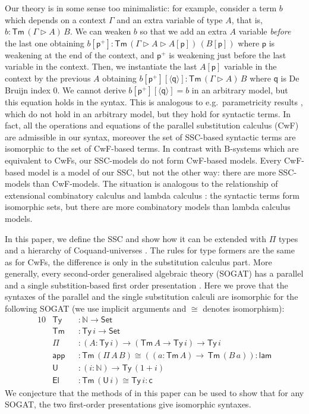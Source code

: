 \documentclass[sigplan,10pt,anonymous,review]{acmart}\settopmatter{printfolios=true,printccs=false,printacmref=false}
\newcommand{\ra}{\rightarrow}
\newcommand{\Set}{\mathsf{Set}}
\newcommand{\Ty}{\mathsf{Ty}}
\newcommand{\Tm}{\mathsf{Tm}}
\newcommand{\p}{\mathsf{p}}
\newcommand{\q}{\mathsf{q}}
\newcommand{\ext}{\mathop{\triangleright}}
\newcommand{\N}{\mathbb{N}}
\newcommand{\lam}{\mathsf{lam}}
\newcommand{\app}{\mathsf{app}}
\newcommand{\U}{\mathsf{U}}
\newcommand{\El}{\mathsf{El}}
\newcommand{\cd}{\mathsf{c}}
\begin{document}
Our theory is in some sense too minimalistic: for example, consider a
term $b$ which depends on a context $\Gamma$ and an extra variable of
type $A$, that is, $b : \Tm\,(\Gamma\ext A)\,B$. We can weaken $b$ so
that we add an extra $A$ variable \emph{before} the last one obtaining
$b[\p^+] : \Tm\,(\Gamma\ext A\ext A[\p])\,(B[\p])$ where $\p$ is
weakening at the end of the context, and $\p^+$ is weakening just
before the last variable in the context. Then, we instantiate the last
$A[\p]$ variable in the context by the previous $A$ obtaining
$b[\p^+][\langle\q\rangle] : \Tm\,(\Gamma\ext A)\,B$ where $\q$ is De
Bruijn index $0$. We cannot derive $b[\p^+][\langle\q\rangle] = b$ in
an arbitrary model, but this equation holds in the syntax.
This is analogous to e.g.\ parametricity results
\cite{DBLP:journals/jfp/BernardyJP12}, which do not hold in an
arbitrary model, but they hold for syntactic terms. In fact, all the
operations and equations of the parallel substitution calculus (CwF)
are admissible in our syntax, moreover the set of SSC-based syntactic
terms are isomorphic to the set of CwF-based terms. In contrast with
B-systems which are equivalent to CwFs, our SSC-models do not form
CwF-based models. Every CwF-based model is a model of our SSC, but not
the other way: there are more SSC-models than CwF-models. The
situation is analogous to the relationship of extensional combinatory
calculus and lambda calculus \cite{DBLP:conf/fscd/AltenkirchKSV23}:
the syntactic terms form isomorphic sets, but there are more
combinatory models than lambda calculus models.

In this paper, we define the SSC and show how it can be extended with
$\Pi$ types and a hierarchy of Coquand-universes
\cite{coquandUniverse}. The rules for type formers are the same as for
CwFs, the difference is only in the substitution calculus part. More
generally, every second-order generalised algebraic theory (SOGAT) has
a parallel and a single substition-based first order presentation
\cite{DBLP:conf/fscd/KaposiX24}. Here we prove that the syntaxes of
the parallel and the single substitution calculi are isomorphic for
the following SOGAT (we use implicit arguments and $\cong$ denotes
isomorphism):
\begin{alignat*}{10}
  & \Ty && : \N\ra\Set \\
  & \Tm && : \Ty\,i\ra\Set \\
  & \Pi && : (A:\Ty\,i)\ra(\Tm\,A\ra\Ty\,i)\ra\Ty\,i \\
  & \app && : \Tm\,(\Pi\,A\,B)\cong((a:\Tm\,A)\ra\,\Tm\,(B\,a)): \lam \\
  & \U && : (i:\N)\ra\Ty\,(1+i) \\
  & \El && : \Tm\,(\U\,i)\cong\Ty\,i : \cd
\end{alignat*}
We conjecture that the methods of in this paper can be used to show
that for any SOGAT, the two first-order presentations give isomorphic
syntaxes.
\end{document}
